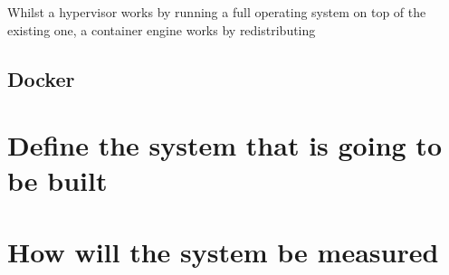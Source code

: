 Whilst a hypervisor works by running a full operating system on top of the existing one, a container engine works by redistributing 

\section{Docker}



\chapter{Define the system that is going to be built}



\chapter{How will the system be measured}
